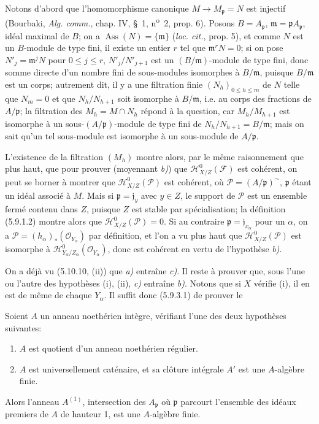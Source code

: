 Notons d'abord que l'homomorphisme canonique $M\to M_\mathfrak p=N$ est
injectif (Bourbaki, \emph{Alg. comm.}, chap. IV, \S~1, n\textsuperscript{o}~2,
prop. 6). Posons $B=A_\mathfrak p$, $\mathfrak m=\mathfrak pA_\mathfrak p$,
idéal maximal de $B$; on a $\operatorname{Ass}(N)=\{\mathfrak m\}$
(\emph{loc. cit.}, prop. 5), et comme $N$ est un $B$-module de type fini,
il existe un entier $r$ tel que $\mathfrak m^rN=0$; si on pose
$N'_j=\mathfrak m^jN$ pour $0\leq j\leq r$, $N'_j/N'_{j+1}$ est un
$(B/\mathfrak m)$-module de type fini, donc somme directe d'un nombre fini de
sous-modules isomorphes à $B/\mathfrak m$, puisque $B/\mathfrak m$ est un
corps; autrement dit, il y a une filtration finie $(N_h)_{0\leq h\leq m}$ de
$N$ telle que $N_m=0$ et que $N_h/N_{h+1}$ soit isomorphe à
$B/\mathfrak m$, i.e. au corps des fractions de $A/\mathfrak p$; la
filtration des $M_h=M\cap N_h$ répond à la question, car $M_h/M_{h+1}$ est
isomorphe à un sous-$(A/\mathfrak p)$-module de type fini de
$N_h/N_{h+1}=B/\mathfrak m$; mais on sait qu'un tel sous-module est isomorphe
à un sous-module de $A/\mathfrak p$.

L'existence de la filtration $(M_h)$ montre alors, par le même raisonnement que
plus haut, que pour prouver (moyennant \emph{b)}) que
$\mathcal H^0_{X/Z}(\mathcal F)$ est cohérent, on peut se borner à montrer que
$\mathcal H^0_{X/Z}(\mathcal P)$ est cohérent, où
$\mathcal P=(A/\mathfrak p)^\sim$, $\mathfrak p$ étant un idéal associé à
$M$. Mais si $\mathfrak p=\mathfrak j_y$ avec $y\in Z$, le support de
$\mathcal P$ est un ensemble fermé contenu dans $Z$, puisque $Z$ est stable
par spécialisation; la définition (5.9.1.2) montre alors que
$\mathcal H^0_{X/Z}(\mathcal P)=0$. Si au contraire
$\mathfrak p=\mathfrak j_{x_\alpha}$ pour un $\alpha$, on a
$\mathcal P=(h_\alpha)_*(\mathcal O_{Y_\alpha})$ par définition, et l'on a vu
plus haut que $\mathcal H^0_{X/Z}(\mathcal P)$ est isomorphe à
$\mathcal H^0_{Y_\alpha/Z_\alpha}(\mathcal O_{Y_\alpha})$,
donc est cohérent en vertu de l'hypothèse \emph{b)}.

On a déjà vu (5.10.10, (ii)) que \emph{a)} entraîne \emph{c)}. Il reste à prouver que, sous
l'une ou l'autre des hypothèses (i), (ii), \emph{c)} entraîne \emph{b)}. Notons que si $X$
vérifie (i), il en est de même de chaque $Y_\alpha$. Il suffit donc (5.9.3.1)
de prouver le

\begin{corollary}[5.11.2]
Soient $A$ un anneau noethérien intègre, vérifiant l'une des deux hypothèses
suivantes:
\begin{enumerate}
\item[\textup{(i)}] $A$ est quotient d'un anneau noethérien régulier.
\item[\textup{(ii)}] $A$ est universellement caténaire, et sa clôture intégrale $A'$ est
une $A$-algèbre finie.
\end{enumerate}
Alors l'anneau $A^{(1)}$, intersection des $A_\mathfrak p$ où $\mathfrak p$
parcourt l'ensemble des idéaux premiers de $A$ de hauteur 1, est une
$A$-algèbre finie.
\end{corollary}

